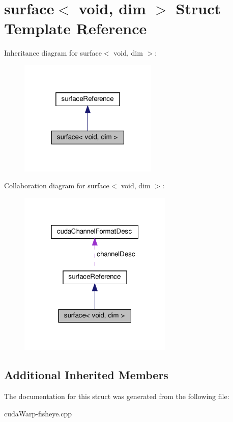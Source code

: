 \hypertarget{structsurface_3_01void_00_01dim_01_4}{}\section{surface$<$ void, dim $>$ Struct Template Reference}
\label{structsurface_3_01void_00_01dim_01_4}


Inheritance diagram for surface$<$ void, dim $>$\+:\nopagebreak
\begin{figure}[H]
\begin{center}
\leavevmode
\includegraphics[width=187pt]{structsurface_3_01void_00_01dim_01_4__inherit__graph}
\end{center}
\end{figure}


Collaboration diagram for surface$<$ void, dim $>$\+:\nopagebreak
\begin{figure}[H]
\begin{center}
\leavevmode
\includegraphics[width=208pt]{structsurface_3_01void_00_01dim_01_4__coll__graph}
\end{center}
\end{figure}
\subsection*{Additional Inherited Members}


The documentation for this struct was generated from the following file\+:\begin{DoxyCompactItemize}
\item 
cuda\+Warp-\/fisheye.\+cpp\end{DoxyCompactItemize}
